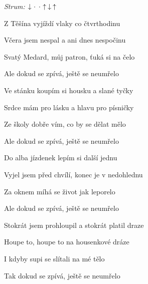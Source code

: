 \begin{song}


 \quad
\textit{Strum:} $\Down\Miss\Miss\Up\Down\Up$

\large


\large

\bigskip

Z Těšína vyjíždí vlaky co čtvrthodinu    \par
{}Včera jsem nespal a ani dnes nespočinu   \par
{}Svatý Medard, můj patron, ťuká si na čelo \par
Ale dokud se zpívá, ještě se neumřelo    \par

\bigskip

Ve stánku koupím si housku a slané tyčky    \par
{}Srdce mám pro lásku a hlavu pro písničky    \par
{}Ze školy dobře vím, co by se dělat mělo \par
Ale dokud se zpívá, ještě se neumřelo    \par

\bigskip

Do alba jízdenek lepím si další jednu    \par
{}Vyjel jsem před chvílí, konec je v nedohlednu    \par
{}Za oknem míhá se život jak leporelo \par
Ale dokud se zpívá, ještě se neumřelo    \par

\bigskip

Stokrát jsem prohloupil a stokrát platil draze    \par
{}Houpe to, houpe to na housenkové dráze    \par
{}I kdyby supi se slítali na mé tělo \par
Tak dokud se zpívá, ještě se neumřelo    \par


\end{song}
